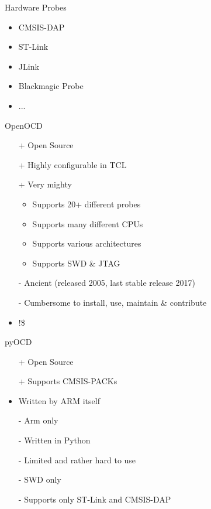 \documentclass[aspectratio=1610,14pt,t]{beamer}
\begin{document}
\begin{frame}[c]{Hardware Probes}
  \begin{itemize}
    \item CMSIS-DAP
    \item ST-Link
    \item JLink
    \item Blackmagic Probe
    \item ...
  \end{itemize}
\end{frame}

\begin{frame}[c]{OpenOCD}
  \begin{itemize}
    \item[+] Open Source
    \item[+] Highly configurable in TCL
    \item[+] Very mighty
      \begin{itemize}
        \item Supports 20+ different probes
        \item Supports many different CPUs
        \item Supports various architectures
        \item Supports SWD \& JTAG
      \end{itemize}
    \item[-] Ancient (released 2005, last stable release 2017)
    \item[-] Cumbersome to install, use, maintain \& contribute
    \item !\$ 
  \end{itemize}
\end{frame}

\begin{frame}[c]{pyOCD}
  \begin{itemize}
    \item[+] Open Source
    \item[+] Supports CMSIS-PACKs 
    \item Written by ARM itself
    \item[-] Arm only
    \item[-] Written in Python
    \item[-] Limited and rather hard to use
    \item[-] SWD only
    \item[-] Supports only ST-Link and CMSIS-DAP   
  \end{itemize}
\end{frame}
\end{document}
